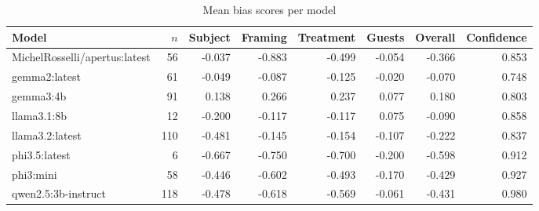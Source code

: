 \begin{table}[ht]
\centering
\caption{Mean bias scores per model}
\label{tab:bias_scores}
\begin{tabular}{l r r r r r r r}
\hline
Model & $n$ & Subject & Framing & Treatment & Guests & Overall & Confidence \\
\hline
MichelRosselli/apertus:latest & 56 & -0.037 & -0.883 & -0.499 & -0.054 & -0.366 & 0.853 \\
gemma2:latest & 61 & -0.049 & -0.087 & -0.125 & -0.020 & -0.070 & 0.748 \\
gemma3:4b & 91 & 0.138 & 0.266 & 0.237 & 0.077 & 0.180 & 0.803 \\
llama3.1:8b & 12 & -0.200 & -0.117 & -0.117 & 0.075 & -0.090 & 0.858 \\
llama3.2:latest & 110 & -0.481 & -0.145 & -0.154 & -0.107 & -0.222 & 0.837 \\
phi3.5:latest & 6 & -0.667 & -0.750 & -0.700 & -0.200 & -0.598 & 0.912 \\
phi3:mini & 58 & -0.446 & -0.602 & -0.493 & -0.170 & -0.429 & 0.927 \\
qwen2.5:3b-instruct & 118 & -0.478 & -0.618 & -0.569 & -0.061 & -0.431 & 0.980 \\
\hline
\end{tabular}
\end{table}